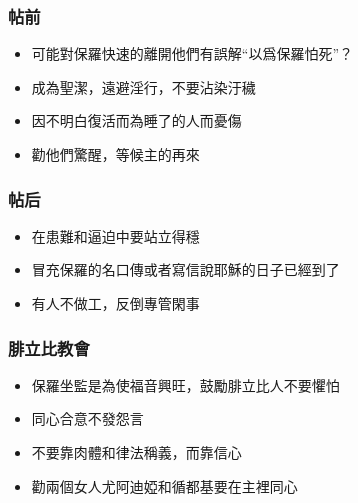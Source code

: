 \subsubsection{帖前}%
\begin{itemize}%
\itemsep-.25em 
\item 可能對保羅快速的離開他們有誤解“以爲保羅怕死”？
\item 成為聖潔，遠避淫行，不要沾染汙穢
\item 因不明白復活而為睡了的人而憂傷
\item 勸他們驚醒，等候主的再來
\end{itemize}


\subsubsection{帖后}%
\begin{itemize}%
\itemsep-.25em 
\item 在患難和逼迫中要站立得穩
\item 冒充保羅的名口傳或者寫信說耶穌的日子已經到了
\item 有人不做工，反倒專管閑事
\end{itemize}


\subsubsection{腓立比教會}%
\begin{itemize}%
\itemsep-.25em 
\item 保羅坐監是為使福音興旺，鼓勵腓立比人不要懼怕
\item 同心合意不發怨言
\item 不要靠肉體和律法稱義，而靠信心
\item 勸兩個女人尤阿迪婭和循都基要在主裡同心
\end{itemize}

